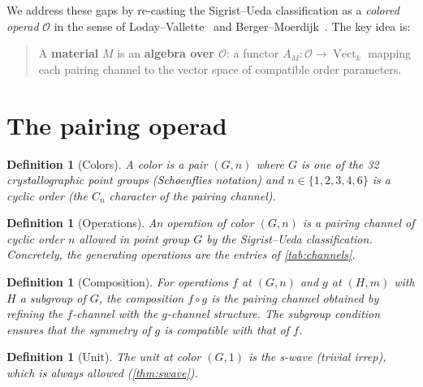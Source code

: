 \documentclass[11pt,a4paper]{article}
\newtheorem{definition}[theorem]{Definition}
\DeclareMathOperator{\Vect}{Vect}
\newcommand{\OO}{\mathcal{O}}
\newcommand{\kk}{k}
\begin{document}
We address these gaps by re-casting the Sigrist--Ueda classification
as a \emph{colored operad} $\OO$ in the sense of
Loday--Vallette~\cite{loday2012} and
Berger--Moerdijk~\cite{berger2007}. The key idea is:

\begin{quote}
  A \textbf{material} $M$ is an \textbf{algebra over $\OO$}: a
  functor $A_M \colon \OO \to \Vect_\kk$ mapping each pairing
  channel to the vector space of compatible order parameters.
\end{quote}

\section{The pairing operad}\label{sec:operad}

\begin{definition}[Colors]\label{def:colors}
  A \emph{color} is a pair $(G, n)$ where $G$ is one of the 32
  crystallographic point groups (Schoenflies notation) and $n \in
  \{1,2,3,4,6\}$ is a cyclic order (the $C_n$ character of the
  pairing channel).
\end{definition}

\begin{definition}[Operations]\label{def:operations}
  An \emph{operation of color $(G, n)$} is a pairing channel of
  cyclic order $n$ allowed in point group $G$ by the Sigrist--Ueda
  classification. Concretely, the generating operations are the
  entries of \cref{tab:channels}.
\end{definition}

\begin{definition}[Composition]\label{def:composition}
  For operations $f$ at $(G, n)$ and $g$ at $(H, m)$ with $H$ a
  subgroup of $G$, the composition $f \circ g$ is the pairing channel
  obtained by refining the $f$-channel with the $g$-channel structure.
  The subgroup condition ensures that the symmetry of $g$ is
  compatible with that of $f$.
\end{definition}

\begin{definition}[Unit]\label{def:unit}
  The unit at color $(G, 1)$ is the s-wave (trivial irrep), which
  is always allowed (\cref{thm:swave}).
\end{definition}
\end{document}
